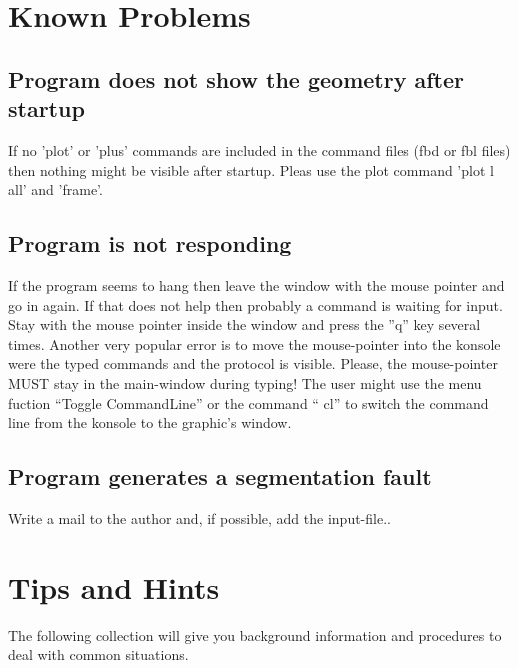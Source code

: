 \documentclass{article}
\begin{document}
\begin{appendix}
\section{\label{Known Problems}Known Problems}
\subsection{\label{Program does not show the geometry after startup}Program does not show the geometry after startup}
If no 'plot' or 'plus' commands are included in the command files (fbd or fbl files) then nothing might be visible after startup. Pleas use the plot command 'plot l all' and 'frame'.

\subsection{\label{Program is not responding}Program is not responding}
If the program seems to hang then leave the window with the mouse pointer and go in again. If that does not help then probably a command is waiting for input. Stay with the mouse pointer inside the window and press the ''q'' key several times. Another very popular error is to move the mouse-pointer into the konsole were the typed commands and the protocol is visible. Please, the mouse-pointer MUST stay in the main-window during typing! The user might use the menu fuction ``Toggle CommandLine'' or the command `` cl'' to switch the command line from the konsole to the graphic's window.

\subsection{\label{Program generates a segmentation fault}Program generates a segmentation fault}
Write a mail to the author and, if possible, add the input-file.\cite{cgx}.

\section{\label{Tips and Hints}Tips and Hints}
The following collection will give you background information and procedures to deal with common situations.


\end{appendix}
\end{document}
